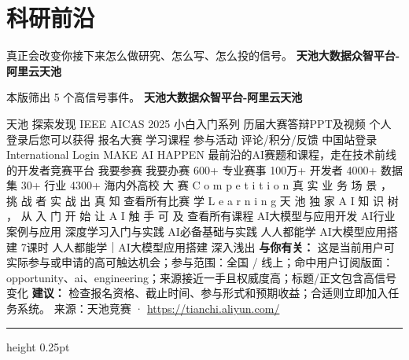 \documentclass[10.5pt]{ctexart}
\begin{document}
\section*{科研前沿}
{\color{ormuted} 真正会改变你接下来怎么做研究、怎么写、怎么投的信号。}
\vspace{2mm}
{\LARGE\bfseries 天池大数据众智平台-阿里云天池}\par
\vspace{1mm}
{\color{ormuted} 本版筛出 5 个高信号事件。}
\vspace{3mm}
{\Large\bfseries 天池大数据众智平台-阿里云天池}\par
天池 探索发现 IEEE AICAS 2025 小白入门系列 历届大赛答辩PPT及视频 个人 登录后您可以获得 报名大赛 学习课程 参与活动 评论/积分/反馈 中国站登录 International Login MAKE AI HAPPEN 最前沿的AI赛题和课程，走在技术前线的开发者竞赛平台 我要参赛 我要办赛 600+ 专业赛事 100万+ 开发者 4000+ 数据集 30+ 行业 4300+ 海内外高校 大 赛 C o m p e t i t i o n 真 实 业 务 场 景 ， 挑 战 者 实 战 出 真 知 查看所有比赛 学 L e a r n i n g 天 池 独 家 A I 知 识 树 ， 从 入 门 开 始 让 A I 触 手 可 及 查看所有课程 AI大模型与应用开发 AI行业案例与应用 深度学习入门与实践 AI必备基础与实践 人人都能学 AI大模型应用搭建 7课时 人人都能学｜AI大模型应用搭建 深入浅出
\textbf{与你有关：} 这是当前用户可实际参与或申请的高可触达机会；参与范围：全国 / 线上；命中用户订阅版面：opportunity、ai、engineering；来源接近一手且权威度高；标题/正文包含高信号变化
\textbf{建议：} 检查报名资格、截止时间、参与形式和预期收益；合适则立即加入任务系统。
{\footnotesize\color{ormuted} 来源：天池竞赛 · \url{https://tianchi.aliyun.com/}}
\vspace{4mm}
\hrule height 0.25pt
\vspace{3mm}
\end{document}
